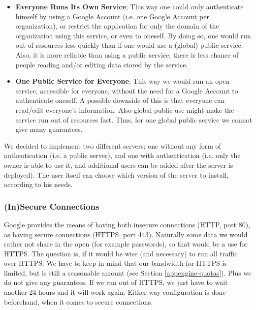 \begin{itemize}
  \item \textbf{Everyone Runs Its Own Service}; This way one could only
  authenticate himself by using a Google Account (i.e. one Google Account per
  organization), or restrict the application for only the domain of the
  organization using this service, or even to oneself. By doing so, one would
  run out of resources less quickly than if one would use a (global) public service.
  Also, it is more reliable than using a public service; there is less chance of
  people reading and/or editing data stored by the service.
  \item \textbf{One Public Service for Everyone}; This way we would run an open
  service, accessible for everyone, without the need for a Google Account to
  authenticate oneself. A possible downside of this is that everyone can
  read/edit everyone's information. Also global public use might make the service
  run out of resources fast. Thus, for one global public service we cannot give
  many guarantees.
\end{itemize}

We decided to implement two different servers; one without any form of
authentication (i.e. a public server), and one with authentication (i.e. only the
owner is able to use it, and additional users can be added after the server is
deployed). The user itself can choose which version of the server to install,
according to his needs.

\subsubsection{(In)Secure Connections}
Google provides the means of having both insecure connections (HTTP, port 80), as
having secure connections (HTTPS, port 443). Naturally some data we would rather
not share in the open (for example passwords), so that would be a use for HTTPS.
The question is, if it would be wise (and necessary) to run all traffic over
HTTPS. We have to keep in mind that our bandwidth for HTTPS is limited, but is
still a reasonable amount (see Section \ref{appengine-quotas}). Plus we do not
give any guarantees. If we run out of HTTPS, we just have to wait another 24
hours and it will work again. Either way configuration is done beforehand, when
it comes to secure connections.
